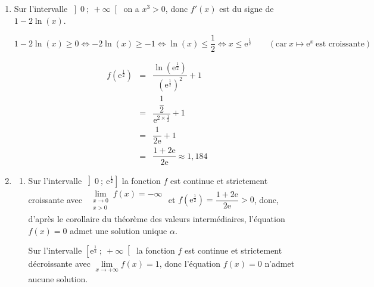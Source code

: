 \documentclass[10pt]{article}
\begin{document}
\begin{enumerate}
	\item Sur l'intervalle \ensuremath{\left]0~;~+\infty\right[} on a $x^{3} > 0$, donc $f'(x)$ est du signe de $1 - 2\ln(x)$.

\[1 - 2\ln(x) \geqslant 0 \iff -2 \ln(x) \geqslant -1 \iff \ln(x) \leqslant \dfrac{1}{2} \iff x \leqslant \text{e}^{\frac{1}{2}} \qquad (\text{car}\ x\mapsto \text{e}^{x}\ \text{est croissante})\]

\begin{minipage}{.6\linewidth}
\begin{center}
\end{center}
\end{minipage}\hfill
\begin{minipage}{.3\linewidth}
\begin{eqnarray*}
f\left(\text{e}^{\frac{1}{2}}\right) &=& \dfrac{\ln\left(\text{e}^{\frac{1}{2}}\right)}{\left(\text{e}^{\frac{1}{2}}\right)^{2}} + 1\\
	&=& \dfrac{\dfrac{1}{2}}{\text{e}^{2\times\frac{1}{2}}} + 1\\
	&=& \dfrac{1}{2\text{e}} + 1\\
	&=& \dfrac{1+2\text{e}}{2\text{e}} \approx 1, 184
\end{eqnarray*}
\end{minipage}
	\item
	\begin{enumerate}
	
		\item Sur l'intervalle \ensuremath{\left]0~;~\text{e}^{\frac{1}{2}}\right]} la fonction $f$ est continue et strictement croissante avec $\begin{gathered}\lim\limits_{\substack{x \to 0\\x > 0}}f(x) = -\infty\end{gathered}$ et $f\left(\text{e}^{\frac{1}{2}}\right) = \dfrac{1+2\text{e}}{2\text{e}} > 0$, donc, d'après le corollaire du théorème des valeurs intermédiaires, l'équation $f(x) = 0$ admet une solution unique $\alpha$.

Sur l'intervalle \ensuremath{\left[\text{e}^{\frac{1}{2}}~;~+\infty\right[} la fonction $f$ est continue et strictement décroissante avec $\lim\limits_{x \to +\infty}f(x) = 1$, donc l'équation $f(x) = 0$ n'admet aucune solution.


\end{enumerate}
\end{enumerate}
\end{document}
